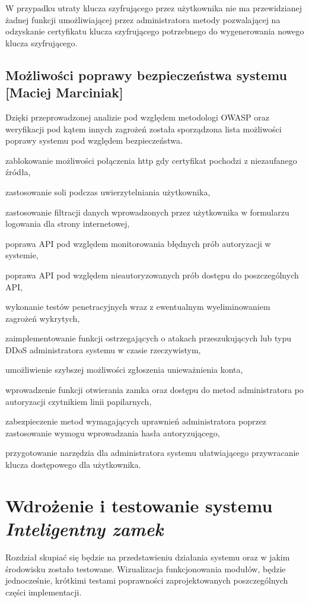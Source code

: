 \documentclass[twoside,10pt]{article}
\def\NazwaSys {\textit{Inteligentny zamek}}
\def\StudentA     {Maciej Marciniak}
\begin{document}
W przypadku utraty klucza szyfrującego przez użytkownika nie ma przewidzianej żadnej funkcji umożliwiającej przez administratora metody pozwalającej na odzyskanie certyfikatu klucza szyfrującego potrzebnego do wygenerowania nowego klucza szyfrującego.

\subsection{Możliwości poprawy bezpieczeństwa systemu [\StudentA]}

Dzięki przeprowadzonej analizie pod względem metodologi OWASP oraz weryfikacji pod kątem innych zagrożeń została sporządzona lista możliwości poprawy systemu pod względem bezpieczeństwa. 
\begin{itemize*}
\item zablokowanie możliwości połączenia http gdy certyfikat pochodzi z niezaufanego źródła,
\item zastosowanie soli podczas uwierzytelniania użytkownika,
\item  zastosowanie filtracji danych wprowadzonych przez użytkownika w formularzu logowania dla strony internetowej,
\item poprawa API pod względem monitorowania błędnych prób autoryzacji w systemie,
\item  poprawa API pod względem nieautoryzowanych prób dostępu do poszczególnych API,
\item wykonanie testów penetracyjnych wraz z ewentualnym wyeliminowaniem zagrożeń wykrytych,
\item zaimplementowanie funkcji ostrzegających o atakach przeszukujących lub typu DDoS administratora systemu w czasie rzeczywistym,
\item umożliwienie szybszej możliwości zgłoszenia unieważnienia konta, 
\item wprowadzenie funkcji otwierania zamka oraz dostępu do metod administratora po autoryzacji czytnikiem linii papilarnych,
\item zabezpieczenie metod wymagających uprawnień administratora poprzez zastosowanie wymogu wprowadzania hasła autoryzującego,
\item przygotowanie narzędzia dla administratora systemu ułatwiającego przywracanie klucza dostępowego dla użytkownika. 
\end{itemize*}

\newpage
\section{Wdrożenie i testowanie systemu \NazwaSys} \label{sec:testy}
Rozdział skupiać się będzie na przedstawieniu działania systemu oraz w jakim środowisku zostało testowane. Wizualizacja funkcjonowania modułów, będzie jednocześnie, krótkimi testami poprawności zaprojektowanych poszczególnych części implementacji. 
\end{document}
